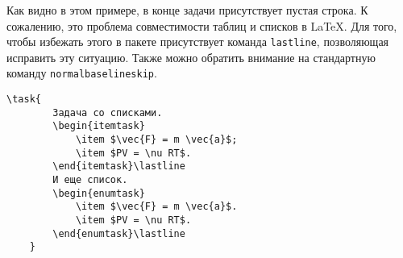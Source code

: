 \noindent
{}

\vspace{0.3cm}

Как видно в этом примере, в конце задачи присутствует пустая строка. К сожалению, это проблема
совместимости таблиц и списков в \LaTeX. Для того, чтобы избежать этого в пакете присутствует команда
\texttt{lastline}, позволяющая исправить эту ситуацию. Также можно обратить внимание на стандартную
команду \texttt{normalbaselineskip}.

\begin{lstlisting}[gobble = 3]
    \task{
        Задача со списками.
        \begin{itemtask}
            \item $\vec{F} = m \vec{a}$;
            \item $PV = \nu RT$.
        \end{itemtask}\lastline
        И еще список.
        \begin{enumtask}
            \item $\vec{F} = m \vec{a}$.
            \item $PV = \nu RT$.
        \end{enumtask}\lastline
    }
\end{lstlisting}

\noindent
{}

